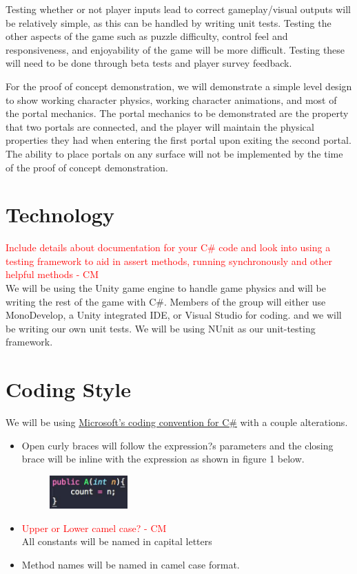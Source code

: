 \documentclass{article}
\begin{document}
Testing whether or not player inputs lead to correct gameplay/visual outputs will be relatively simple, as this can be handled by writing unit tests. Testing the other aspects of the game such as puzzle difficulty, control feel and responsiveness, and enjoyability of the game will be more difficult. Testing these will need to be done through beta tests and player survey feedback.

For the proof of concept demonstration, we will demonstrate a simple level design to show working character physics, working character animations, and most of the portal mechanics. The portal mechanics to be demonstrated are the property that two portals are connected, and the player will maintain the physical properties they had when entering the first portal upon exiting the second portal. The ability to place portals on any surface will not be implemented by the time of the proof of concept demonstration.

\section{Technology}
\textcolor{red}{Include details about documentation for your C\# code and look into using a testing framework to aid in assert methods, running synchronously and other helpful methods - CM} \\
We will be using the Unity game engine to handle game physics and will be writing the rest of the game with C\#.
Members of the group will either use MonoDevelop, a Unity integrated IDE, or Visual Studio for coding. and we will be writing our own unit tests. We will be using NUnit as our unit-testing framework.

\section{Coding Style}
We will be using \href{https://msdn.microsoft.com/en-us/library/ff926074.aspx}{Microsoft's coding convention for C\#} with a couple alterations.
\begin{itemize}

  \item Open curly braces will follow the expression?s parameters and the closing brace will be inline with the expression as shown in figure 1 below.

\begin{figure}[H]
\centering
  \includegraphics[width=30mm,scale = 0.25]{curlyBraces.jpg}
\end{figure}

  \item \textcolor{red}{Upper or Lower camel case? - CM} \\ All constants will be named in capital letters

  \item Method names will be named in camel case format.

\end{itemize}
\end{document}
